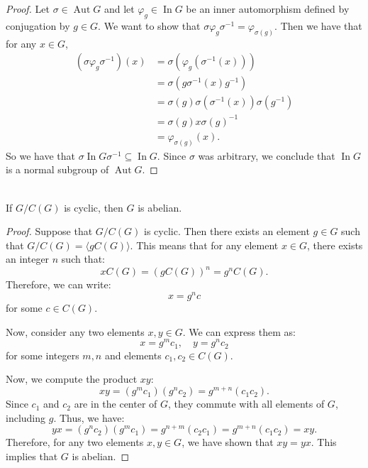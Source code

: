 \documentclass{article}
\begin{document}
\begin{proof}
    Let $\sigma \in \operatorname{Aut} G$ and let $\varphi_g \in \operatorname{In} G$ be an inner automorphism defined by conjugation by $g \in G$. We want to show that $\sigma \varphi_g \sigma^{-1} = \varphi_{\sigma(g)}$. Then we have that for any $x \in G$,
    \begin{align*}
        (\sigma \varphi_g \sigma^{-1})(x) &= \sigma(\varphi_g(\sigma^{-1}(x))) \\
        &= \sigma(g \sigma^{-1}(x) g^{-1}) \\
        &= \sigma(g) \sigma(\sigma^{-1}(x)) \sigma(g^{-1}) \\
        &= \sigma(g) x \sigma(g)^{-1} \\
        &= \varphi_{\sigma(g)}(x).
    \end{align*}
    So we have that $\sigma \operatorname{In} G \sigma^{-1} \subseteq \operatorname{In} G$. Since $\sigma$ was arbitrary, we conclude that $\operatorname{In} G$ is a normal subgroup of $\operatorname{Aut} G$.
\end{proof}

\newpage
\begin{problem}[II.4.9] \\
    If $G/C(G)$ is cyclic, then $G$ is abelian.
\end{problem}


\begin{proof}
    Suppose that $G/C(G)$ is cyclic. Then there exists an element $g \in G$ such that $G/C(G) = \langle gC(G) \rangle$. This means that for any element $x \in G$, there exists an integer $n$ such that:
    \[
        xC(G) = (gC(G))^n = g^n C(G).
    \]
    Therefore, we can write:
    \[
        x = g^n c
    \]
    for some $c \in C(G)$.

    Now, consider any two elements $x, y \in G$. We can express them as:
    \[
        x = g^m c_1, \quad y = g^n c_2
    \]
    for some integers $m, n$ and elements $c_1, c_2 \in C(G)$.

    Now, we compute the product $xy$:
    \[
        xy = (g^m c_1)(g^n c_2) = g^{m+n} (c_1 c_2).
    \]
    Since $c_1$ and $c_2$ are in the center of $G$, they commute with all elements of $G$, including $g$. Thus, we have:
    \[
        yx = (g^n c_2)(g^m c_1) = g^{n+m} (c_2 c_1) = g^{m+n} (c_1 c_2) = xy.
    \]
    Therefore, for any two elements $x, y \in G$, we have shown that $xy = yx$. This implies that $G$ is abelian.
\end{proof}
\end{document}
